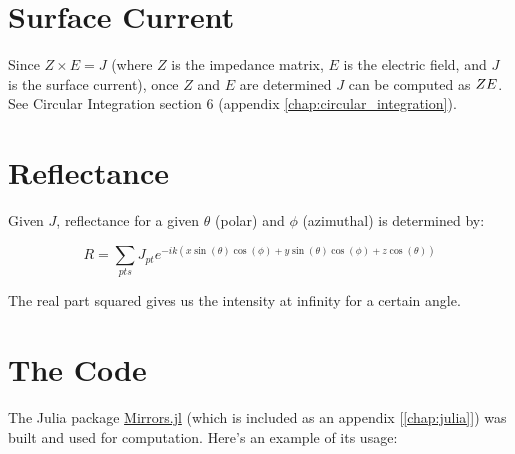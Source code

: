 \documentclass[etd,twoside,senior,noacknowledgments]{BYUPhys}
\begin{document}

\section{Surface Current} \label{sec:current}

Since $Z \times E = J$ (where $Z$ is the impedance matrix, $E$ is the electric field, and $J$ is the surface current), once $Z$ and $E$ are determined $J$ can be computed as $Z\\E$. See Circular Integration section 6 (appendix \ref{chap:circular_integration}).



\section{Reflectance} \label{sec:reflectance}

Given $J$, reflectance for a given $\theta$ (polar) and $\phi$ (azimuthal) is determined by:

\begin{equation}
  R=\sum_{pts}J_{pt}e^{-ik\left(x\sin\left(\theta\right)\cos\left(\phi\right)+y\sin\left(\theta\right)\cos\left(\phi\right)+z\cos\left(\theta\right)\right)}
\end{equation}

The real part squared gives us the intensity at infinity for a certain angle.







\section{The Code}\label{sec:code}

The Julia package \href{https://github.com/mjg0/Mirrors.jl}{Mirrors.jl} (which is included as an appendix [\ref{chap:julia}]) was built and used for computation. Here's an example of its usage:
\end{document}
